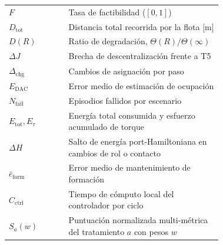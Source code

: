 \begin{longtable}{@{}l@{\hskip 2em}>{\raggedright\arraybackslash}p{0.72\linewidth}@{}}
$F$                         & Tasa de factibilidad ($[0,1]$) \\
$D_{\mathrm{tot}}$          & Distancia total recorrida por la flota [m] \\
$D(R)$                      & Ratio de degradación, $\Theta(R)/\Theta(\infty)$ \\
$\Delta J$                  & Brecha de descentralización frente a T5 \\
$\Delta_{\mathrm{chg}}$     & Cambios de asignación por paso \\
$E_{\mathrm{DAC}}$          & Error medio de estimación de ocupación \\
$N_{\mathrm{fail}}$         & Episodios fallidos por escenario \\
$E_{\mathrm{tot}},E_\tau$   & Energía total consumida y esfuerzo acumulado de torque \\
$\Delta H$                  & Salto de energía port-Hamiltoniana en cambios de rol o contacto \\
$\bar e_{\mathrm{form}}$    & Error medio de mantenimiento de formación \\
$C_{\mathrm{ctrl}}$         & Tiempo de cómputo local del controlador por ciclo \\
$S_a(w)$                    & Puntuación normalizada multi-métrica del tratamiento $a$ con pesos $w$ \\
\bottomrule
\end{longtable}
\endgroup
\setcounter{table}{0}
